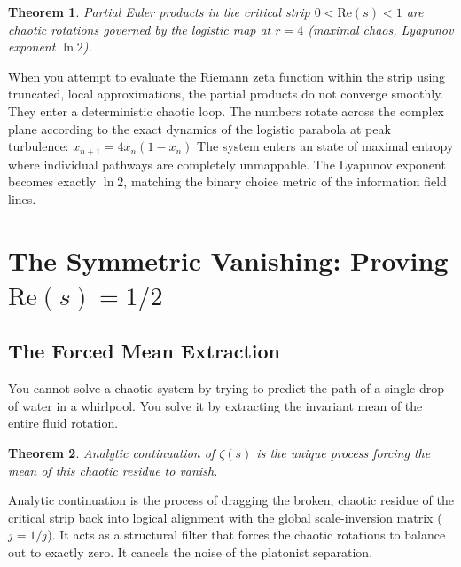 \documentclass[11pt,a4paper]{article}
\newtheorem{theorem}{Theorem}[section]
\begin{document}
\begin{theorem}
Partial Euler products in the critical strip $0 < \text{Re}(s) < 1$ are chaotic rotations governed by the logistic map at $r = 4$ (maximal chaos, Lyapunov exponent $\ln 2$).
\end{theorem}

When you attempt to evaluate the Riemann zeta function within the strip using truncated, local approximations, the partial products do not converge smoothly. They enter a deterministic chaotic loop. The numbers rotate across the complex plane according to the exact dynamics of the logistic parabola at peak turbulence:
\(x_{n+1}=4x_{n}(1-x_{n})\)
The system enters an state of maximal entropy where individual pathways are completely unmappable. The Lyapunov exponent becomes exactly $\ln 2$, matching the binary choice metric of the information field lines.
\section{The Symmetric Vanishing: Proving $\text{Re}(s) = 1/2$}
\subsection{The Forced Mean Extraction}
You cannot solve a chaotic system by trying to predict the path of a single drop of water in a whirlpool. You solve it by extracting the invariant mean of the entire fluid rotation.
\begin{theorem}
Analytic continuation of $\zeta(s)$ is the unique process forcing the mean of this chaotic residue to vanish.
\end{theorem}
Analytic continuation is the process of dragging the broken, chaotic residue of the critical strip back into logical alignment with the global scale-inversion matrix ($j = 1/j$). It acts as a structural filter that forces the chaotic rotations to balance out to exactly zero. It cancels the noise of the platonist separation.
\end{document}
